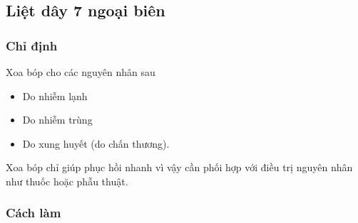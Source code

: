 \subsection{Liệt dây 7 ngoại biên}

\subsubsection{Chỉ định}
Xoa bóp cho các nguyên nhân sau
\begin{itemize}
    \item Do nhiễm lạnh
    \item Do nhiễm trùng
    \item Do xung huyết (do chấn thương).
\end{itemize}

Xoa bóp chỉ giúp phục hồi nhanh vì vậy cần phối hợp với điều trị
nguyên nhân như thuốc hoặc phẫu thuật.

\subsubsection{Cách làm}

